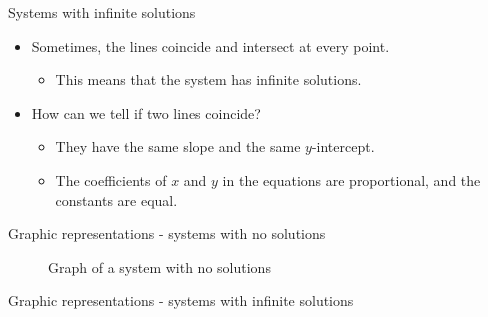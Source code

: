 \documentclass[
  10pt,
  ignorenonframetext,
]{beamer}
\providecommand{\tightlist}{%
  \setlength{\itemsep}{0pt}\setlength{\parskip}{0pt}}\usepackage{longtable,booktabs,array}
\begin{document}
\begin{frame}{Systems with infinite solutions}
\label{systems-with-infinite-solutions}
\begin{itemize}
\tightlist
\item
  Sometimes, the lines coincide and intersect at every point.

  \begin{itemize}
  \tightlist
  \item
    This means that the system has infinite solutions.
  \end{itemize}
\item
  How can we tell if two lines coincide?

  \begin{itemize}
  \tightlist
  \item
    They have the same slope and the same \(y\)-intercept.
  \item
    The coefficients of \(x\) and \(y\) in the equations are
    proportional, and the constants are equal.
  \end{itemize}
\end{itemize}
\end{frame}

\begin{frame}{Graphic representations - systems with no solutions}
\label{graphic-representations---systems-with-no-solutions}
\begin{figure}
\centering
{}
\caption{Graph of a system with no solutions}
\end{figure}
\end{frame}

\begin{frame}{Graphic representations - systems with infinite solutions}
\label{graphic-representations---systems-with-infinite-solutions}
\begin{figure}
\centering
{}
\end{figure}
\end{frame}
\end{document}

